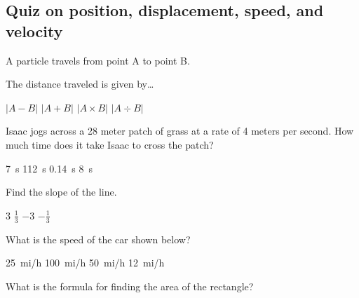 \documentclass[]{exam}
\begin{document}
\clearpage

\subsection*{Quiz on position, displacement, speed, and velocity}

\begin{questions}

\question
A particle travels from point A to point B.


The distance traveled is given by\ldots

\begin{randomizechoices}
    \correctchoice $\displaystyle \big|A - B\big|$
    \choice $\displaystyle \big|A + B\big|$
    \choice $\displaystyle \big|A \times B\big|$
    \choice $\displaystyle \big|A \div B\big|$
\end{randomizechoices}



\question
Isaac jogs across a 28 meter patch of grass at a rate of 4 meters per second. How much time does it take Isaac to cross the patch?

\begin{randomizechoices}
    \correctchoice \SI{7}{s}
    \choice \SI{112}{s}
    \choice \SI{0.14}{s}
    \choice \SI{8}{s}
\end{randomizechoices}

\question Find the slope of the line.


\begin{randomizechoices}
    \correctchoice $3$
    \choice $\frac{1}{3}$
    \choice $-3$
    \choice $-\frac{1}{3}$
\end{randomizechoices}

\question
What is the speed of the car shown below?


\begin{randomizechoices}
    \correctchoice \SI{25}{mi/h}
    \choice \SI{100}{mi/h}
    \choice \SI{50}{mi/h}
    \choice \SI{12}{mi/h}
\end{randomizechoices}

\question
What is the formula for finding the area of the rectangle?
\vspace{1em}

\vspace{1em}


\end{questions}
\end{document}

